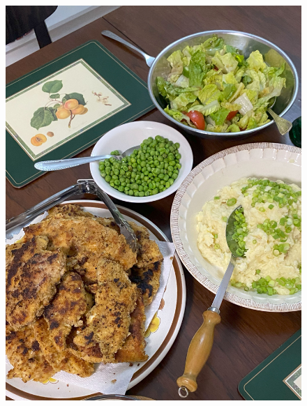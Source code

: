 \documentclass[]{article}
\begin{document}
\newpage\begin{figure}[H]
\begin{center}\hyperref[rec:Chicken Schnitzel]{\includegraphics[keepaspectratio,width=\textwidth,height=\textheight]{Gallery/Chicken Schnitzel}}\caption*{}\label{fig:Chicken Schnitzel}\end{center}
\end{figure}
\end{document}
